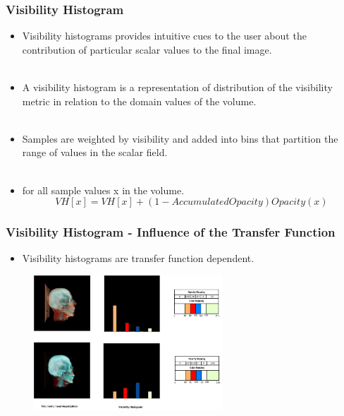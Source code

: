 \documentclass{beamer}
\begin{document}
\begin{frame}
\frametitle{Visibility Histogram}
\begin{itemize}
\item Visibility histograms provides intuitive cues to the user about the contribution of particular scalar values to the final image. \\ $ $
\item A visibility histogram is a representation of distribution of the visibility metric in relation to the domain values of the volume. \\ $ $
\item Samples are weighted by visibility and added into bins that partition the range of values in the scalar field. \\ $ $
\item for all sample values x in the volume.
\begin{equation}
VH[x] = VH[x] + ( 1 - AccumulatedOpacity ) Opacity(x) 
\end{equation}
\end{itemize}

\end{frame}


\begin{frame}
\frametitle{Visibility Histogram - Influence of the Transfer Function }
\begin{itemize}
\item Visibility histograms are transfer function dependent.
\end{itemize}
\begin{figure}
\centering
\includegraphics[width=200pt]{tf_influence.jpg}
\end{figure}
\end{frame}

\end{document}
